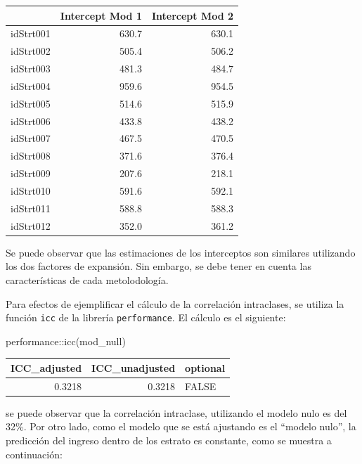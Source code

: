 \documentclass[
  12pt,
]{book}
\newenvironment{Shaded}{\begin{snugshade}}{\end{snugshade}}
\newcommand{\FunctionTok}[1]{\textcolor[rgb]{0.00,0.00,0.00}{#1}}
\newcommand{\NormalTok}[1]{#1}
\newcommand{\SpecialCharTok}[1]{\textcolor[rgb]{0.00,0.00,0.00}{#1}}
\begin{document}
\begin{tabular}{l|r|r}
\hline
  & Intercept Mod 1 & Intercept Mod 2\\
\hline
idStrt001 & 630.7 & 630.1\\
\hline
idStrt002 & 505.4 & 506.2\\
\hline
idStrt003 & 481.3 & 484.7\\
\hline
idStrt004 & 959.6 & 954.5\\
\hline
idStrt005 & 514.6 & 515.9\\
\hline
idStrt006 & 433.8 & 438.2\\
\hline
idStrt007 & 467.5 & 470.5\\
\hline
idStrt008 & 371.6 & 376.4\\
\hline
idStrt009 & 207.6 & 218.1\\
\hline
idStrt010 & 591.6 & 592.1\\
\hline
idStrt011 & 588.8 & 588.3\\
\hline
idStrt012 & 352.0 & 361.2\\
\hline
\end{tabular}

Se puede observar que las estimaciones de los interceptos son similares utilizando los dos factores de expansión. Sin embargo, se debe tener en cuenta las características de cada metolodología.

Para efectos de ejemplificar el cálculo de la correlación intraclases, se utiliza la función \texttt{icc} de la librería \texttt{performance}. El cálculo es el siguiente:

\begin{Shaded}
\begin{Highlighting}[]
\NormalTok{performance}\SpecialCharTok{::}\FunctionTok{icc}\NormalTok{(mod\_null)}
\end{Highlighting}
\end{Shaded}

\begin{tabular}{r|r|l}
\hline
ICC\_adjusted & ICC\_unadjusted & optional\\
\hline
0.3218 & 0.3218 & FALSE\\
\hline
\end{tabular}

se puede observar que la correlación intraclase, utilizando el modelo nulo es del 32\%. Por otro lado, como el modelo que se está ajustando es el ``modelo nulo'', la predicción del ingreso dentro de los estrato es constante, como se muestra a continuación:
\end{document}
